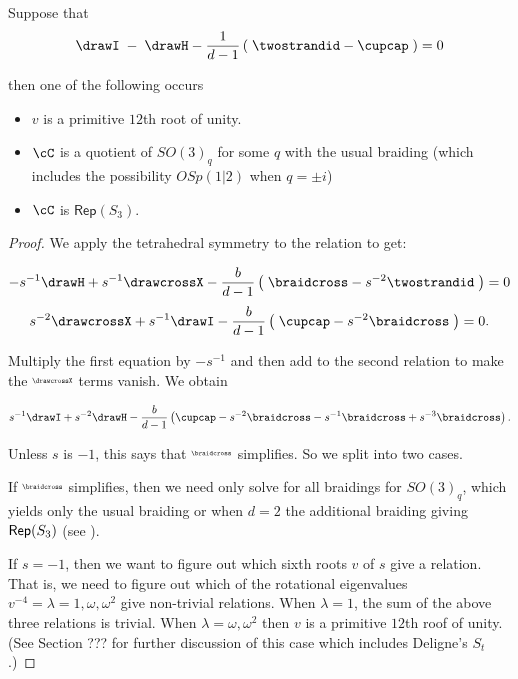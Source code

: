 \documentclass[12pt]{amsart}
\begin{document}
\begin{lemma} \label{lem:IequalsH}
Suppose that 
$$\drawI\;- \; \drawH - \frac{1}{d-1} \left(\; \twostrandid - \cupcap \;\right) = 0$$

then one of the following occurs

\begin{itemize}
\item $v$ is a primitive $12$th root of unity.

\item
$\cC$ is a quotient of $SO(3)_q$ for some $q$ with the usual braiding (which
includes the possibility $OSp(1|2)$ when $q= \pm i$)

\item
$\cC$ is  $\mathsf{Rep}(S_3)$.

\end{itemize}
\end{lemma}
\begin{proof}
We apply the tetrahedral symmetry to the relation to get:

$$-s^{-1} \drawH + s^{-1} \drawcrossX -\frac{b}{d-1} \left(\; \braidcross - s^{-2} \twostrandid \; \right) = 0$$
$$s^{-2} \drawcrossX + s^{-1} \drawI -\frac{b}{d-1} \left(\; \cupcap -s^{-2} \braidcross \; \right) = 0.$$

Multiply the first equation by $-s^{-1}$ and then add to the second relation to make the $\raisebox{0.8mm}{\scalebox{0.5}{\drawcrossX}}$ terms vanish. We obtain

$$s^{-1} \drawI + s^{-2} \drawH - \frac{b}{d-1} \left(\cupcap -s^{-2} \braidcross -s^{-1}\braidcross + s^{-3}\braidcross  \right).$$

Unless $s$ is $-1$, this says that $\raisebox{0.8mm}{\scalebox{0.5}{\braidcross}}$ simplifies.  So we split into two cases.

If $\raisebox{0.8mm}{\scalebox{0.5}{\braidcross}}$ simplifies, then we need only solve for all braidings for
$SO(3)_q$, which yields only the usual braiding or when $d=2$ the
additional braiding giving $\operatorname{\mathsf{Rep}}(S_3)$ (see \cite[Example 8.6]{MR3624901}).

If $s = -1$, then we want to figure out which sixth roots $v$ of $s$ give a
relation.  That is, we need to figure out which of the rotational eigenvalues
$v^{-4} = \lambda = 1, \omega, \omega^2$ give non-trivial relations.  When
$\lambda = 1$, the sum of the above three relations is trivial.  When $\lambda
= \omega, \omega^2$ then $v$ is a primitive $12$th roof of unity.  (See
Section ??? for further discussion of this case which includes Deligne's
$S_t$.)
\end{proof}
\end{document}
